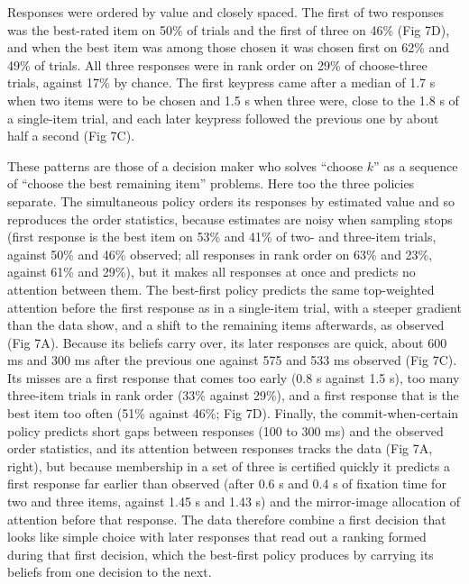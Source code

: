 \documentclass[10pt,letterpaper]{article}
\begin{document}
Responses were ordered by value and closely spaced. The first of two
responses was the best-rated item on 50\% of trials and the first of
three on 46\% (Fig 7D), and when the best item was among those chosen it
was chosen first on 62\% and 49\% of trials. All three responses were in
rank order on 29\% of choose-three trials, against 17\% by chance. The
first keypress came after a median of 1.7 s when two items were to be
chosen and 1.5 s when three were, close to the 1.8 s of a single-item
trial, and each later keypress followed the previous one by about half a
second (Fig 7C).

These patterns are those of a decision maker who solves ``choose \(k\)''
as a sequence of ``choose the best remaining item'' problems. Here too
the three policies separate. The simultaneous policy orders its
responses by estimated value and so reproduces the order statistics,
because estimates are noisy when sampling stops (first response is the
best item on 53\% and 41\% of two- and three-item trials, against 50\%
and 46\% observed; all responses in rank order on 63\% and 23\%, against
61\% and 29\%), but it makes all responses at once and predicts no
attention between them. The best-first policy predicts the same
top-weighted attention before the first response as in a single-item
trial, with a steeper gradient than the data show, and a shift to the
remaining items afterwards, as observed (Fig 7A). Because its beliefs
carry over, its later responses are quick, about 600 ms and 300 ms after
the previous one against 575 and 533 ms observed (Fig 7C). Its misses
are a first response that comes too early (0.8 s against 1.5 s), too
many three-item trials in rank order (33\% against 29\%), and a first
response that is the best item too often (51\% against 46\%; Fig 7D).
Finally, the commit-when-certain policy predicts short gaps between
responses (100 to 300 ms) and the observed order statistics, and its
attention between responses tracks the data (Fig 7A, right), but because
membership in a set of three is certified quickly it predicts a first
response far earlier than observed (after 0.6 s and 0.4 s of fixation
time for two and three items, against 1.45 s and 1.43 s) and the
mirror-image allocation of attention before that response. The data
therefore combine a first decision that looks like simple choice with
later responses that read out a ranking formed during that first
decision, which the best-first policy produces by carrying its beliefs
from one decision to the next.
\end{document}

